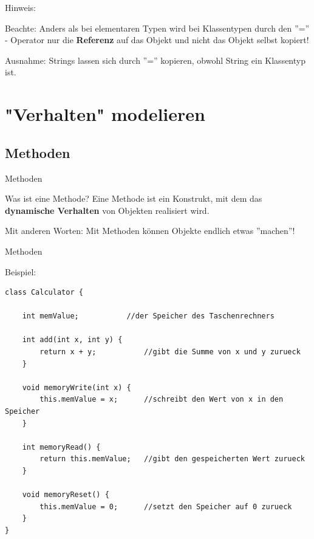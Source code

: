 \documentclass[18pt]{beamer}
\begin{document}
\begin{frame}{Hinweis:}
\begin{alertblock}{Beachte:}
Anders als bei elementaren Typen wird bei Klassentypen durch den ''='' - Operator nur die \textbf{Referenz} auf das Objekt und nicht das Objekt selbst kopiert!
\end{alertblock}
\pause
\begin{block}{Ausnahme:}
Strings lassen sich durch ''='' kopieren, obwohl String ein Klassentyp ist.
\end{block}
\end{frame}

\section{"Verhalten" modelieren}

\subsection{Methoden}

\begin{frame}{Methoden}
\begin{block}{Was ist eine Methode?}
Eine Methode ist ein Konstrukt, mit dem das \textbf{dynamische Verhalten} von Objekten realisiert wird.
\end{block}
\pause
Mit anderen Worten: Mit Methoden können Objekte endlich etwas ''machen''!
\end{frame}

\begin{frame}[containsverbatim]{Methoden}
\begin{exampleblock}{Beispiel:}
\begin{lstlisting}[basicstyle=\scriptsize]
class Calculator {

	int memValue;			//der Speicher des Taschenrechners

	int add(int x, int y) {
		return x + y;			//gibt die Summe von x und y zurueck
	}

	void memoryWrite(int x) {
		this.memValue = x;		//schreibt den Wert von x in den Speicher
	}

	int memoryRead() {
		return this.memValue;	//gibt den gespeicherten Wert zurueck
	}

	void memoryReset() {
		this.memValue = 0;		//setzt den Speicher auf 0 zurueck
	}
}
\end{lstlisting}
\end{exampleblock}
\end{frame}
\end{document}
